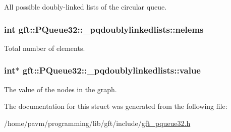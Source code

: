 All possible doubly-\/linked lists of the circular queue. 

\hypertarget{structgft_1_1PQueue32_1_1__pqdoublylinkedlists_aac1cff87642f59107cbec2ef52c8be11}{
\subsubsection[{nelems}]{\setlength{\rightskip}{0pt plus 5cm}int gft\-::\-P\-Queue32\-::\-\_\-pqdoublylinkedlists\-::nelems}}\label{structgft_1_1PQueue32_1_1__pqdoublylinkedlists_aac1cff87642f59107cbec2ef52c8be11}


Total number of elements. 

\hypertarget{structgft_1_1PQueue32_1_1__pqdoublylinkedlists_a97c614bd8679dc49d6134f1380e173ef}{
\subsubsection[{value}]{\setlength{\rightskip}{0pt plus 5cm}int$\ast$ gft\-::\-P\-Queue32\-::\-\_\-pqdoublylinkedlists\-::value}}\label{structgft_1_1PQueue32_1_1__pqdoublylinkedlists_a97c614bd8679dc49d6134f1380e173ef}


The value of the nodes in the graph. 



The documentation for this struct was generated from the following file\-:\begin{DoxyCompactItemize}
\item 
/home/pavm/programming/lib/gft/include/\hyperlink{gft__pqueue32_8h}{gft\-\_\-pqueue32.\-h}\end{DoxyCompactItemize}
